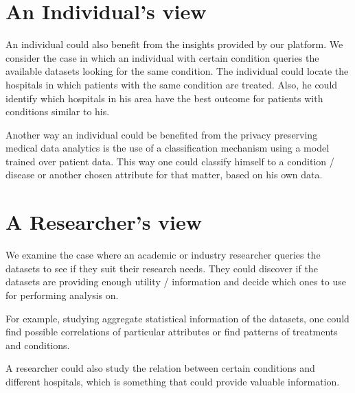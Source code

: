 \section{An Individual's view}
An individual could also benefit from the insights provided by our platform.
We consider the case in which an individual with certain condition queries the available datasets looking for the same condition.
The individual could locate the hospitals in which patients with the same condition are treated.
Also, he could identify which hospitals in his area have the best outcome for patients with conditions similar to his.

Another way an individual could be benefited from the privacy preserving medical data analytics is the use of a classification mechanism using a model trained over patient data.
This way one could classify himself to a condition / disease or another chosen attribute for that matter, based on his own data.

\section{A Researcher's view}
We examine the case where an academic or industry researcher queries the datasets to see if they suit their research needs.
They could discover if the datasets are providing enough utility / information and decide which ones to use for performing analysis on.

For example, studying aggregate statistical information of the datasets, one could find possible correlations of particular attributes or find patterns of treatments and conditions.

A researcher could also study the relation between certain conditions and different hospitals, which is something that could provide valuable information.



%
%

